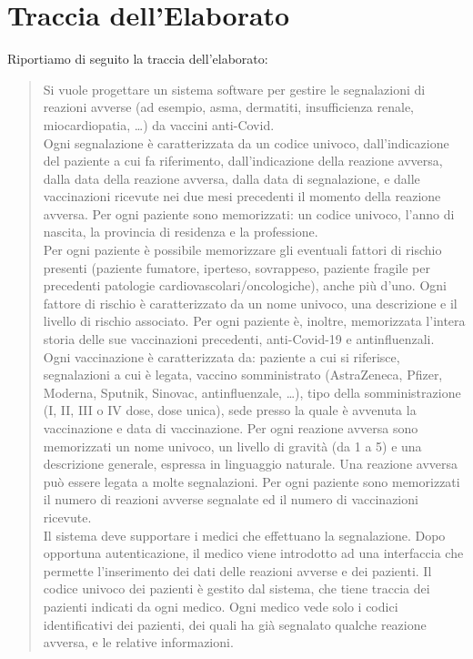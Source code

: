 \documentclass{article}
\begin{document}
\section{Traccia dell'Elaborato}
Riportiamo di seguito la traccia dell'elaborato:
\begin{quotation}
    Si vuole progettare un sistema software per gestire le segnalazioni di reazioni avverse (ad esempio, asma, dermatiti, insufficienza renale, miocardiopatia, \dots) da vaccini anti-Covid.\\
    Ogni segnalazione è caratterizzata da un codice univoco, dall'indicazione del paziente a cui fa riferimento, dall'indicazione della reazione avversa, dalla data della reazione avversa, dalla data di segnalazione, e dalle vaccinazioni ricevute nei due mesi precedenti il momento della reazione avversa.
    Per ogni paziente sono memorizzati: un codice univoco, l'anno di nascita, la provincia di residenza e la professione.\\
    Per ogni paziente è possibile memorizzare gli eventuali fattori di rischio presenti (paziente fumatore, iperteso, sovrappeso, paziente fragile per precedenti patologie cardiovascolari/oncologiche), anche più d'uno. Ogni fattore di rischio è caratterizzato da un nome univoco, una descrizione e il livello di rischio associato. Per ogni paziente è, inoltre, memorizzata l'intera storia delle sue vaccinazioni precedenti, anti-Covid-19 e antinfluenzali.\\
    Ogni vaccinazione è caratterizzata da: paziente a cui si riferisce, segnalazioni a cui è legata, vaccino somministrato (AstraZeneca, Pfizer, Moderna, Sputnik, Sinovac, antinfluenzale, \dots), tipo della somministrazione (I, II, III o IV dose, dose unica), sede presso la quale è avvenuta la vaccinazione e data di vaccinazione. Per ogni reazione avversa sono memorizzati un nome univoco, un livello di gravità (da 1 a 5) e una descrizione generale, espressa in linguaggio naturale. Una reazione avversa può essere legata a molte segnalazioni. Per ogni paziente sono memorizzati il numero di reazioni avverse segnalate ed il numero di vaccinazioni ricevute.\\
    Il sistema deve supportare i medici che effettuano la segnalazione. Dopo opportuna autenticazione, il medico viene introdotto ad una interfaccia che permette l'inserimento dei dati delle reazioni avverse e dei pazienti. Il codice univoco dei pazienti è gestito dal sistema, che tiene traccia dei pazienti indicati da ogni medico. Ogni medico vede solo i codici identificativi dei pazienti, dei quali ha già segnalato qualche reazione avversa, e le relative informazioni.\\

\end{quotation}
\end{document}
